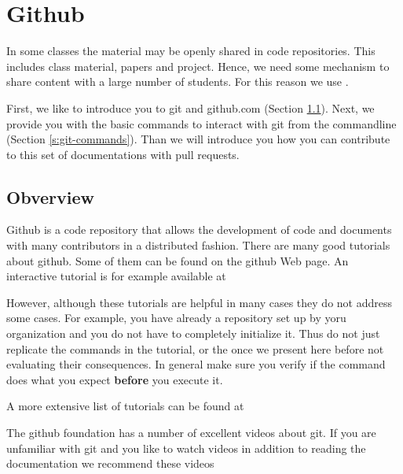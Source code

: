 

\chapter{Github}
\label{C:github}

\FILENAME

In some classes the material may be openly shared in code
repositories. This includes class material, papers and project.
Hence, we need some mechanism to share content with a large number of
students. For this reason we use .

First, we like to introduce you to git and github.com (Section
\ref{s:github}).  Next, we provide you with the basic commands to
interact with git from the commandline (Section
\ref{s:git-commands}). Than we will introduce you how you can
contribute to this set of documentations with pull requests.

\section{Obverview}\label{s:github}

Github is a code repository that allows the development of code and
documents with many contributors in a distributed fashion. There are
many good tutorials about github.  Some of them can be found on the
github Web page. An interactive tutorial is for example available at


However, although these tutorials are helpful in many cases they do
not address some cases. For example, you have already a repository set
up by yoru organization and you do not have to completely initialize
it. Thus do not just replicate the commands in the tutorial, or the
once we present here before not evaluating their consequences. In
general make sure you verify if the command does what you expect {\bf
  before} you execute it.

A more extensive list of tutorials can be found at


The github foundation has a number of excellent videos about git. If you
are unfamiliar with git and you like to watch videos in addition to
reading the documentation we recommend these videos


